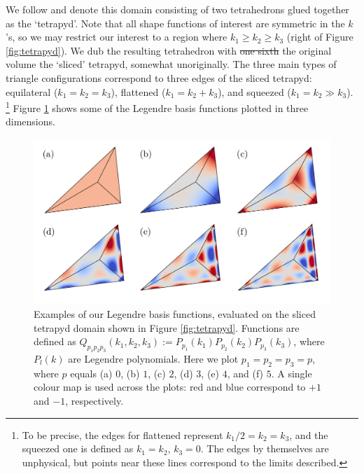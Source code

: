 \documentclass[a4paper,12pt,times,custombib,print,index]{Classes/PhDThesisPSnPDF} %
\providecommand{\DIFadd}[1]{{\protect\color{blue}\uwave{#1}}} %
\providecommand{\DIFdel}[1]{{\protect\color{red}\sout{#1}}}                      %
\providecommand{\DIFaddbegin}{} %
\providecommand{\DIFaddend}{} %
\providecommand{\DIFdelbegin}{} %
\providecommand{\DIFdelend}{} %
\newcommand{\DIFscaledelfig}{0.5}
\newlength{\DIFdelgraphicswidth} %
\newlength{\DIFdelgraphicsheight} %
\newcommand{\DIFaddincludegraphics}[2][]{{\color{blue}\fbox{\DIFOincludegraphics[#1]{#2}}}} %
\newcommand{\DIFdelincludegraphics}[2][]{%
\sbox{\DIFdelgraphicsbox}{\DIFOincludegraphics[#1]{#2}}%
\settoboxwidth{\DIFdelgraphicswidth}{\DIFdelgraphicsbox} %
\settoboxtotalheight{\DIFdelgraphicsheight}{\DIFdelgraphicsbox} %
\scalebox{\DIFscaledelfig}{%
\parbox[b]{\DIFdelgraphicswidth}{\usebox{\DIFdelgraphicsbox}\\[-\baselineskip] \rule{\DIFdelgraphicswidth}{0em}}\llap{\resizebox{\DIFdelgraphicswidth}{\DIFdelgraphicsheight}{%
\setlength{\unitlength}{\DIFdelgraphicswidth}%
\begin{picture}(1,1)%
\thicklines\linethickness{2pt} %
{\color[rgb]{1,0,0}\put(0,0){\framebox(1,1){}}}%
{\color[rgb]{1,0,0}\put(0,0){\line( 1,1){1}}}%
{\color[rgb]{1,0,0}\put(0,1){\line(1,-1){1}}}%
\end{picture}%
}\hspace*{3pt}}} %
} %
\DeclareRobustCommand{\DIFaddbegin}{\DIFOaddbegin \let\includegraphics\DIFaddincludegraphics} %
\DeclareRobustCommand{\DIFaddend}{\DIFOaddend \let\includegraphics\DIFOincludegraphics} %
\DeclareRobustCommand{\DIFdelbegin}{\DIFOdelbegin \let\includegraphics\DIFdelincludegraphics} %
\DeclareRobustCommand{\DIFdelend}{\DIFOaddend \let\includegraphics\DIFOincludegraphics} %
\begin{document}
We follow \cite{Fergusson2010general} and denote this domain consisting of two tetrahedrons glued together as the `tetrapyd'. Note that all shape functions of interest are symmetric in the $k$'s, so we may restrict our interest to a region where $k_1 \ge k_2 \ge k_3$ (right of Figure \ref{fig:tetrapyd}). We dub the resulting tetrahedron with \DIFdelbegin \DIFdel{one sixth }\DIFdelend \DIFaddbegin \DIFadd{one-sixth }\DIFaddend the original volume the `sliced' tetrapyd, somewhat unoriginally. The three main types of triangle configurations correspond to three edges of the sliced tetrapyd: equilateral ($k_1=k_2=k_3$), flattened ($k_1 = k_2 + k_3$), and squeezed ($k_1 = k_2 \gg k_3$). \footnote{To be precise, the edges for flattened represent $k_1/2 = k_2 = k_3$, and the squeezed one is defined as $k_1=k_2$, $k_3=0$. The edges by themselves are unphysical, but points near these lines correspond to the limits described.} Figure \ref{fig:Legendre_basis_functions_3D} shows some of the Legendre basis functions plotted in three dimensions.

\begin{figure}
	\centering    
	\includegraphics[width=1.0\textwidth]{legendre_modes_3D_final.pdf}
	\caption{Examples of our Legendre basis functions, evaluated on the sliced tetrapyd domain shown in Figure \ref{fig:tetrapyd}. Functions are defined as $Q_{p_1 p_2 p_3}(k_1,k_2,k_3) := P_{p_1}(k_1) P_{p_2}(k_2) P_{p_3}(k_3)$, where $P_l(k)$ are Legendre polynomials. Here we plot $p_1 = p_2 = p_3 = p$, where $p$ equals (a) $0$, (b) $1$, (c) $2$, (d) $3$, (e) $4$, and (f) $5$. A single colour map is used across the plots: red and blue correspond to $+1$ and $-1$, respectively.}	
	\label{fig:Legendre_basis_functions_3D}
\end{figure}
\end{document}
